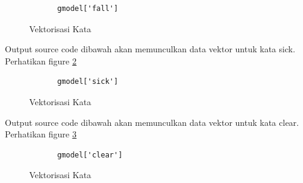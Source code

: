 \begin{enumerate}
		\begin{verbatim}
			gmodel['fall']
		\end{verbatim}

		\begin{figure}[ht]
			\caption{Vektorisasi Kata}
			\label{YNC5-8}
		\end{figure}

Output source code dibawah akan memunculkan data vektor untuk kata sick. Perhatikan figure \ref{YNC5-9}

		\begin{verbatim}
			gmodel['sick']
		\end{verbatim}

		\begin{figure}[ht]
			\caption{Vektorisasi Kata}
			\label{YNC5-9}
		\end{figure}

Output source code dibawah akan memunculkan data vektor untuk kata clear. Perhatikan figure \ref{YNC5-10}

		\begin{verbatim}
			gmodel['clear']
		\end{verbatim}

		\begin{figure}[ht]
			\caption{Vektorisasi Kata}
			\label{YNC5-10}
		\end{figure}


\end{enumerate}
